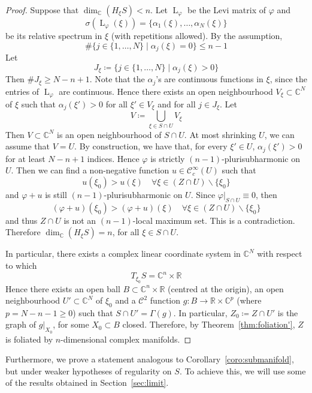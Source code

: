 \documentclass[reqno,oneside]{amsart}
\newcommand{\numberset}{\mathbb}
\newcommand{\R}{\numberset{R}}
\newcommand{\C}{\numberset{C}}
\renewcommand{\phi}{\varphi}
\theoremstyle{definition}
\theoremstyle{plain}
\theoremstyle{remark}
\begin{document}
\begin{proof}
    Suppose that $\dim_\C(H_\xi S)<n$. Let $\operatorname{L}_\phi$ be the Levi matrix of $\phi$ and
    \[
        \sigma(\operatorname{L}_\phi(\xi))=\{\alpha_1(\xi),\dots,\alpha_N(\xi)\}
    \]
    be its relative spectrum in $\xi$ (with repetitions allowed). By the assumption,
    \[
        \#\bigl\{j\in\{1,\dots,N\} \mid \alpha_j(\xi)=0\bigr\}\leq n-1
    \]
    Let
    \[
        J_\xi\coloneqq\bigl\{j\in\{1,\dots,N\} \mid \alpha_j(\xi)>0\bigr\}
    \]
    Then $\# J_\xi\geq N-n+1$. Note that the $\alpha_j$'s are continuous functions in $\xi$, since the entries of $\operatorname{L}_\phi$ are continuous. Hence there exists an open neighbourhood $V_\xi\subset\C^N$ of $\xi$ such that $\alpha_j(\xi')>0$ for all $\xi'\in V_\xi$ and for all $j\in J_\xi$. Let
    \[
        V\coloneqq\bigcup_{\xi\in S\cap U} V_\xi
    \]
    Then $V\subset\C^N$ is an open neighbourhood of $S\cap U$. At most shrinking $U$, we can assume that $V=U$. By construction, we have that, for every $\xi'\in U$, $\alpha_j(\xi')>0$ for at least $N-n+1$ indices. Hence $\phi$ is strictly $(n-1)$-plurisubharmonic on $U$. Then we can find a non-negative function $u\in\mathscr{C}^\infty_c(U)$ such that
    \[
        u(\xi_0)>u(\xi) \quad \forall\xi\in(Z\cap U)\smallsetminus\{\xi_0\} 
    \]
    and $\phi+u$ is still $(n-1)$-plurisubharmonic on $U$. Since $\phi|_{S\cap U}\equiv0$, then 
    \[
        (\phi+u)(\xi_0)>(\phi+u)(\xi) \quad \forall\xi\in(Z\cap U)\smallsetminus\{\xi_0\}
    \]
    and thus $Z\cap U$ is not an $(n-1)$-local maximum set. This is a contradiction. Therefore $\dim_\C(H_\xi S)=n$, for all $\xi\in S\cap U$.
    
    In particular, there exists a complex linear coordinate system in $\C^N$ with respect to which
    \[
        T_{\xi_0}S=\C^n\times\R
    \]
    Hence there exists an open ball $B\subset\C^n\times\R$ (centred at the origin), an open neighbourhood $U'\subset\C^N$ of $\xi_0$ and a $\mathscr{C}^2$ function $g:B\to\R\times\C^p$ (where $p=N-n-1\geq0$) such that $S\cap U'=\Gamma(g)$. In particular, $Z_0\coloneqq Z\cap U'$ is the graph of $g|_{X_0}$, for some $X_0\subset B$ closed. Therefore, by Theorem~\ref{thm:foliation'}, $Z$ is foliated by $n$-dimensional complex manifolds.
\end{proof}

Furthermore, we prove a statement analogous to Corollary~\ref{coro:submanifold}, but under weaker hypotheses of regularity on $S$. To achieve this, we will use some of the results obtained in Section~\ref{sec:limit}.
\end{document}
